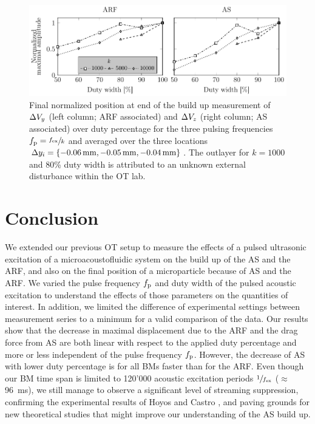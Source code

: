 \begin{figure}[tbp]
  \centering
  \includegraphics[]{External/PU-avg-end-over-duty.pdf}
  \caption{Final normalized position at end of the build up measurement of 
  $\Delta V_{y}$ (left column; ARF associated) and $\Delta V_{z}$ (right column; AS 
  associated) over duty percentage for the three pulsing frequencies 
  $f_{\mathrm{p}}=\sfrac{f_{\mathrm{ex}}}{k}$ and averaged over the three locations $\Dy_{i} =
\{\SI{-0.06}{\mm},\SI{-0.05}{\mm},\SI{-0.04}{\mm}\}$. The outlayer for $k=1000$ 
and 80\% duty width is attributed to an unknown external disturbance within the 
OT lab.}\label{fig:PU-all-duty}
\end{figure}

\section{Conclusion}
We extended our previous OT setup to measure the effects of a pulsed ultrasonic 
excitation of a microacoustofluidic system on the build up of the AS and the 
ARF, and also on the final position of a microparticle because of AS and the 
ARF. We varied the pulse frequency $f_{\mathrm{p}}$ and duty width of the pulsed acoustic 
excitation to understand the effects of those parameters on the quantities of 
interest. In addition, we limited the difference of experimental settings 
between measurement series to a minimum for a valid comparison of the data. Our 
results show that the decrease in maximal displacement due to the ARF and the 
drag force from AS are both linear with respect to the applied duty percentage 
and more or less independent of the pulse frequency $f_{\mathrm{p}}$. However, the 
decrease of AS with lower duty percentage is for all BMs faster than for the 
ARF. Even though our BM time span is limited to 120'000 acoustic excitation 
periods $\sfrac{1}{f_{\mathrm{ex}}}$ ($\approx$ \SI{96}{\ms}), we still manage to observe 
a significant level of streaming suppression, confirming the experimental 
results of Hoyos and Castro \cite{Castro2016,Hoyos2013}, and paving grounds for 
new theoretical studies that might improve our understanding of the AS build 
up.

